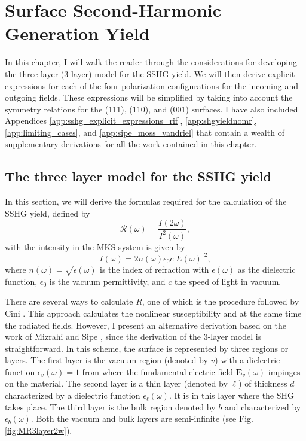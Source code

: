 \chapter{Surface Second-Harmonic Generation Yield}\label{chap:sshgyield}
\partialtoc

In this chapter, I will walk the reader through the considerations for
developing the three layer (3-layer) model for the SSHG yield. We will then
derive explicit expressions for each of the four polarization configurations for
the incoming and outgoing fields. These expressions will be simplified by taking
into account the symmetry relations for the (111), (110), and (001) surfaces. I
have also included Appendices \ref{app:sshg_explicit_expressions_rif},
\ref{app:shgyieldnomr}, \ref{app:limiting_cases}, and
\ref{app:sipe_moss_vandriel} that contain a wealth of supplementary derivations
for all the work contained in this chapter.



\section{The three layer model for the SSHG yield}

In this section, we will derive the formulas required for the calculation of the
SSHG yield, defined by
\begin{equation}\label{eq:rintensities}
\mathcal{R}(\omega)=\frac{I(2\omega)}{I^2(\omega)},
\end{equation}
with the intensity in the MKS system is given by \cite{boyd, sutherland}
\begin{equation}\label{eq:intensitymks}
I(\omega)=2n(\omega)\epsilon_{0}c|E(\omega)|^2,
\end{equation}
where $n(\omega)=\sqrt{\epsilon(\omega)}$ is the index of refraction with
$\epsilon(\omega)$ as the dielectric function, $\epsilon_{0}$ is the vacuum
permittivity, and $c$ the speed of light in vacuum.

There are several ways to calculate $R$, one of which is the procedure followed
by Cini \cite{ciniPRB91}. This approach calculates the nonlinear susceptibility
and at the same time the radiated fields. However, I present an alternative
derivation based on the work of Mizrahi and Sipe \cite{mizrahiJOSA88}, since the
derivation of the 3-layer model is straightforward. In this scheme, the surface
is represented by three regions or layers. The first layer is the vacuum region
(denoted by $v$) with a dielectric function $\epsilon_{v}(\omega)=1$ from where
the fundamental electric field $\mathbf{E}_{v}(\omega)$ impinges on the
material. The second layer is a thin layer (denoted by $\ell$) of thickness $d$
characterized by a dielectric function $\epsilon_{\ell}(\omega)$. It is in this
layer where the SHG takes place. The third layer is the bulk region denoted by
$b$ and characterized by $\epsilon_{b}(\omega)$. Both the vacuum and bulk layers
are semi-infinite (see Fig. \ref{fig:MR3layer2w}).

